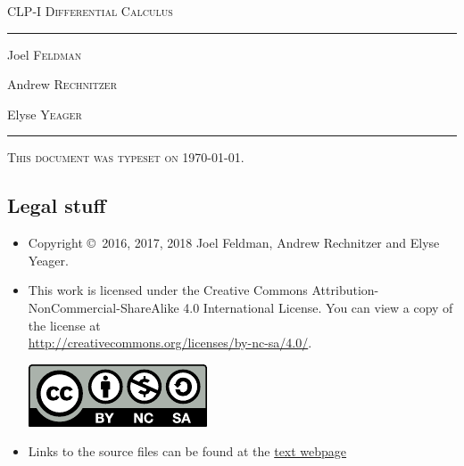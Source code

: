 \documentclass[12pt,letterpaper]{book}
\begin{document}
\begin{titlepage}
\begin{center}
\textsc{\LARGE CLP-I Differential Calculus
}\\[2ex]

\vspace{5ex}
\hrule
\vspace{5ex}

\begin{minipage}[t]{0.3\textwidth} \begin{flushleft}
\large Joel \textsc{Feldman}
\end{flushleft} \end{minipage}%
\begin{minipage}[t]{0.3\textwidth} \begin{flushleft}
\large Andrew \textsc{Rechnitzer}
\end{flushleft} \end{minipage}%
\begin{minipage}[t]{0.3\textwidth} \begin{flushright}
\large Elyse \textsc{Yeager}
\end{flushright} \end{minipage}%
\end{center}
\vspace{2ex}
\hrule

\vfill
\textsc{This document was typeset on \today.}
\end{titlepage}

\subsection*{Legal stuff}
\begin{itemize}
 \item Copyright \copyright\ 2016, 2017, 2018 Joel Feldman, Andrew Rechnitzer and Elyse Yeager.

\item This work is licensed under the
Creative Commons Attribution-NonCommercial-ShareAlike 4.0 International
License. You can view a copy of the license at \\
\url{http://creativecommons.org/licenses/by-nc-sa/4.0/}.
\begin{center}
 \includegraphics{by-nc-sa.pdf}
\end{center}


\item Links to the source files can be found at the \href{http://www.math.ubc.ca/~CLP/index.html}{text webpage}
\end{itemize}
\end{document}
